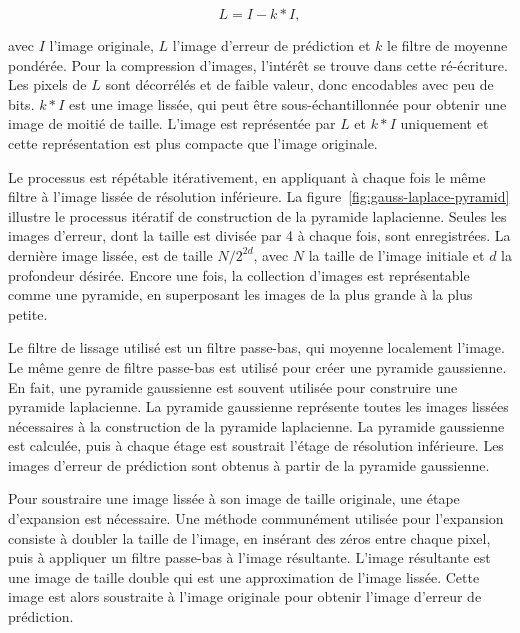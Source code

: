 \begin{equation}
    L = I - k * I,
\end{equation}

\noindent avec $I$ l'image originale, $L$ l'image d'erreur de prédiction et $k$ le filtre de moyenne pondérée. Pour la compression d'images, l'intérêt se trouve dans cette ré-écriture. Les pixels de $L$ sont décorrélés et de faible valeur, donc encodables avec peu de bits. $k*I$ est une image lissée, qui peut être sous-échantillonnée pour obtenir une image de moitié de taille. L'image est représentée par $L$ et $k*I$ uniquement et cette représentation est plus compacte que l'image originale.

\bigskip

Le processus est répétable itérativement, en appliquant à chaque fois le même filtre à l'image lissée de résolution inférieure. La figure~\ref{fig:gauss-laplace-pyramid} illustre le processus itératif de construction de la pyramide laplacienne. Seules les images d'erreur, dont la taille est divisée par 4 à chaque fois, sont enregistrées. La dernière image lissée, est de taille $N/2^{2d}$, avec $N$ la taille de l'image initiale et $d$ la profondeur désirée. Encore une fois, la collection d'images est représentable comme une pyramide, en superposant les images de la plus grande à la plus petite.

\bigskip

Le filtre de lissage utilisé est un filtre passe-bas, qui moyenne localement l'image. Le même genre de filtre passe-bas est utilisé pour créer une pyramide gaussienne. En fait, une pyramide gaussienne est souvent utilisée pour construire une pyramide laplacienne. La pyramide gaussienne représente toutes les images lissées nécessaires à la construction de la pyramide laplacienne. La pyramide gaussienne est calculée, puis à chaque étage est soustrait l'étage de résolution inférieure. Les images d'erreur de prédiction sont obtenus à partir de la pyramide gaussienne.

\bigskip

Pour soustraire une image lissée à son image de taille originale, une étape d'expansion est nécessaire. Une méthode communément utilisée pour l'expansion consiste à doubler la taille de l'image, en insérant des zéros entre chaque pixel, puis à appliquer un filtre passe-bas à l'image résultante. L'image résultante est une image de taille double qui est une approximation de l'image lissée. Cette image est alors soustraite à l'image originale pour obtenir l'image d'erreur de prédiction.

